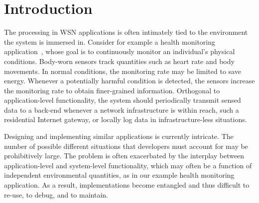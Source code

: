 \section{Introduction}
The processing in WSN applications is often intimately tied to the
environment the system is immersed in. Consider for example a health
monitoring application~\cite{ko10wireless}, whose goal is to
continuously monitor an individual's physical conditions. Body-worn
sensors track quantities such as heart rate and body movements. In
normal conditions, the monitoring rate may be limited to save
energy. Whenever a potentially harmful condition is detected, the
sensors increase the monitoring rate to obtain finer-grained
information. Orthogonal to application-level functionality, the system
should periodically transmit sensed data to a back-end whenever a
network infrastructure is within reach, such a residential Internet
gateway, or locally log data in infrastructure-less situations.

 
Designing and implementing similar applications is currently
intricate. The number of possible different situations that developers
must account for may be prohibitively large. The problem is often
exacerbated by the interplay between application-level and
system-level functionality, which may often be a function of
independent environmental quantities, as in our example health
monitoring application. As a result, implementations become entangled
and thus difficult to re-use, to debug, and to maintain.


